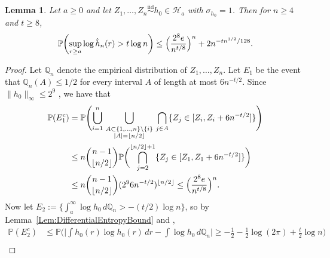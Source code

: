 \documentclass[a4paper,12pt]{article}
\newtheorem{lemma}[theorem]{Lemma}
\newcommand{\red}[1]{{\color{red}#1}}
\newcommand{\blue}[1]{{\color{blue}#1}}
\begin{document}
\begin{lemma}
  \label{Lem:ExtremeEventControl}
Let $a \geq 0$ and let $Z_1,\ldots, Z_n \stackrel{\mathrm{iid}}{\sim} h_0 \in \mathcal{H}_{a}$ with $\sigma_{h_0} = 1$.  Then for $n \geq 4$ and $t \geq 8$,
\[
\mathbb{P}\biggl(\sup_{r \geq a} \log \hat{h}_n(r) > t\log n\biggr) \leq \Bigl(\frac{2^8 e}{n^{t/8}}\Bigr)^n + 2n^{-t n^{1/2}/128}.
\]
\end{lemma}
\begin{proof}
  Let $\mathbb{Q}_n$ denote the empirical distribution of $Z_1,\ldots,Z_n$.  Let $E_{1}$ be the event that $\mathbb{Q}_n(A) \leq 1/2$ for every interval $A$ of length at most $6n^{-t/2}$.  Since $\|h_0\|_\infty \leq 2^9$ \citep[][Theorem~5.14(b) and (d)]{lovasz2007geometry}, we have that
\begin{align*}
  \mathbb{P}(E_1^c) &= \mathbb{P}\Biggl(\bigcup_{i=1}^n \, \bigcup_{\substack{ A \subset \{1,\ldots,n\} \setminus \{i\} \\ |A| = \lfloor n /2 \rfloor} } \, \bigcap_{j \in A} \{Z_j \in [Z_i,Z_i+6n^{-t/2}]\} \Biggr)  \\
                    &\leq n \binom{n-1}{ \lfloor n/2 \rfloor } \mathbb{P} \biggl( \bigcap_{j=2}^{ \lfloor n/2\rfloor + 1} \{ Z_j \in [Z_1, Z_1 + 6 n^{-t/2}] \} \biggr) \\
    &\leq n \binom{n-1}{ \lfloor n/2 \rfloor } (2^9 6 n^{-t/2})^{\lfloor n/2 \rfloor} \leq  \Bigl(\frac{2^8 e}{n^{t/8}}\Bigr)^n.
\end{align*}
Now let $E_{2} := \bigl\{\int_{a}^\infty  \log h_0 \, d\mathbb{Q}_n > -(t/2) \log n\bigr\}$, so by Lemma~\ref{Lem:DifferentialEntropyBound} and \citet[][Theorem~1.1]{bobkov2011concentration},
  \begin{align*}
\mathbb{P}(E_2^c) &\leq \mathbb{P}\biggl(\biggl|\int h_0(r) \log h_0(r) \, dr - \int \log h_0 \, d\mathbb{Q}_n\biggr| \geq -\frac{1}{2} - \frac{1}{2}\log(2\pi) + \frac{t}{2} \log n\biggr) \\

\end{align*}
\end{proof}
\end{document}
